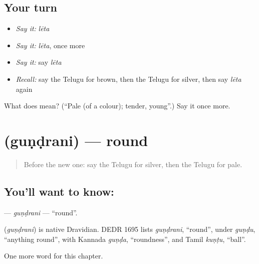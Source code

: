\subsection*{Your turn}
\begin{itemize}
\raggedright
  \item \emph{Say it:} \emph{lēta}
  \item \emph{Say it:} \emph{lēta}, once more
  \item \emph{Say it:} say \emph{lēta}
  \item \emph{Recall:} say the Telugu for brown, then the Telugu for silver, then say \emph{lēta} again
\end{itemize}

\begin{tcolorbox}[breakable,colback=teal!4,colframe=teal!35!black,title={Before you move on}]
What does  mean? (\textquotedblleft{}Pale (of a colour); tender, young\textquotedblright{}.) Say it once more.
\end{tcolorbox}
\section[\texorpdfstring{\te{గుండ్రని} (guṇḍrani)}{గుండ్రని (guṇḍrani)}]{ (guṇḍrani) — round}

\label{lesson:TE-C221-gundrani}



\begin{quote}
Before the new one: say the Telugu for silver, then the Telugu for pale.
\end{quote}

\subsection*{You'll want to know: }
\textbf{} — \emph{guṇḍrani} — \textquotedblleft{}round\textquotedblright{}.

\begin{cousinweb}
\textbf{} (\emph{guṇḍrani}) is native Dravidian. DEDR 1695 lists \emph{guṇḍrani}, \textquotedblleft{}round\textquotedblright{}, under \emph{guṇḍu}, \textquotedblleft{}anything round\textquotedblright{}, with Kannada \emph{guṇḍa}, \textquotedblleft{}roundness\textquotedblright{}, and Tamil \emph{kuṇṭu}, \textquotedblleft{}ball\textquotedblright{}.
\end{cousinweb}

\begin{grammarlens}[title={What you've built}]
One more word for this chapter.
\end{grammarlens}

